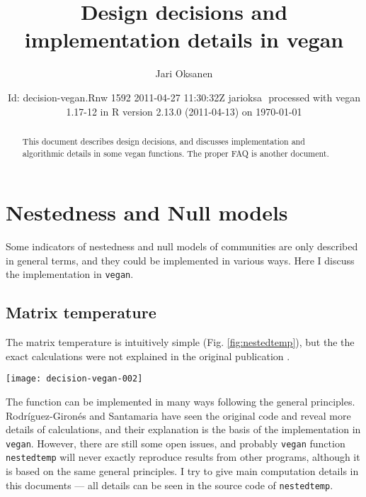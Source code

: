\documentclass[a4paper,10pt]{amsart}
\author{Jari Oksanen}
\title{Design decisions and implementation details in vegan}
\date{$ $Id: decision-vegan.Rnw 1592 2011-04-27 11:30:32Z jarioksa $ $
  processed with vegan
1.17-12
in R version 2.13.0 (2011-04-13) on \today}
\begin{document}

\maketitle

\begin{abstract}

\noindent This document describes design decisions, and discusses implementation
and algorithmic details in some vegan functions. The proper FAQ is
another document.

\end{abstract}

\tableofcontents

\section{Nestedness and Null models}

Some indicators of nestedness and null models of communities are only
described in general terms, and they could be implemented in various
ways. Here I discuss the implementation in \texttt{vegan}.

\subsection{Matrix temperature}

The matrix temperature is intuitively simple
(Fig. \ref{fig:nestedtemp}), but the the exact calculations were not
explained in the original publication \cite{AtmarPat93}.
\begin{SCfigure}
\texttt{[image: decision-vegan-002]}
\label{fig:nestedtemp}
\caption{Matrix temperature for \emph{Falco subbuteo} on Sibbo
  Svartholmen (dot). The curve is the fill line, and in a cold
  matrix, all presences (red squares) should be in the upper left
  corner behind the fill line. Dashed diagonal line of length $D$ goes
  through the point, and an arrow of length $d$ connects the point to
  the fill line. The ``surprise'' for this point is $u = (d/D)^2$ and
  the matrix temperature is based on the sum of surprises: presences
  outside the fill line or absences within the fill line.}
\end{SCfigure}
The function can be implemented in many ways following the general
principles.  Rodr{\'i}guez-Giron{\'e}s and Santamaria \cite{RodGir06}
have seen the original code and reveal more details of calculations,
and their explanation is the basis of the implementation in
\texttt{vegan}.  However, there are still some open issues, and
probably \texttt{vegan} function \texttt{nestedtemp} will never
exactly reproduce results from other programs, although it is based on
the same general principles. I try to give main computation details in
this documents --- all details can be seen in the source code of
\texttt{nestedtemp}.
\end{document}
